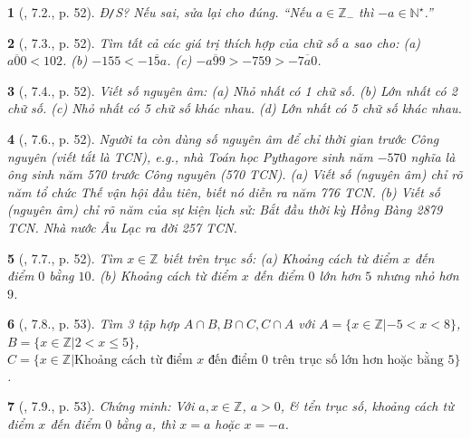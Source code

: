 \documentclass{article}
\newtheorem{baitoan}{}
\begin{document}
\begin{baitoan}[\cite{Binh_boi_duong_Toan_6_tap_1}, 7.2., p. 52]
	{\rm Đ{\tt/}S?} Nếu sai, sửa lại cho đúng. ``Nếu $a\in\mathbb{Z}_-$ thì $-a\in\mathbb{N}^\star$.''
\end{baitoan}

\begin{baitoan}[\cite{Binh_boi_duong_Toan_6_tap_1}, 7.3., p. 52]
	Tìm tất cả các giá trị thích hợp của chữ số $a$ sao cho: (a) $\overline{a00} < 102$. (b) $-155 < -\overline{15a}$. (c) $-\overline{a99} > -759 > -\overline{7a0}$.
\end{baitoan}

\begin{baitoan}[\cite{Binh_boi_duong_Toan_6_tap_1}, 7.4., p. 52]
	Viết số nguyên âm: (a) Nhỏ nhất có 1 chữ số. (b) Lớn nhất có 2 chữ số. (c) Nhỏ nhất có 5 chữ số khác nhau. (d) Lớn nhất có 5 chữ số khác nhau.
\end{baitoan}

\begin{baitoan}[\cite{Binh_boi_duong_Toan_6_tap_1}, 7.6., p. 52]
	Người ta còn dùng số nguyên âm để chỉ thời gian trước Công nguyên (viết tắt là {\rm TCN}), e.g., nhà Toán học Pythagore sinh năm $-570$ nghĩa là ông sinh năm 570 trước Công nguyên ({\rm570 TCN}). (a) Viết số (nguyên âm) chỉ rõ năm tổ chức Thế vận hội đầu tiên, biết nó diễn ra năm {\rm776 TCN}. (b) Viết số (nguyên âm) chỉ rõ năm của sự kiện lịch sử: Bắt đầu thời kỳ Hồng Bàng {\rm2879 TCN}. Nhà nước Âu Lạc ra đời {\rm257 TCN}.
\end{baitoan}

\begin{baitoan}[\cite{Binh_boi_duong_Toan_6_tap_1}, 7.7., p. 52]
	Tìm $x\in\mathbb{Z}$ biết trên trục số: (a) Khoảng cách từ điểm $x$ đến điểm $0$ bằng $10$. (b) Khoảng cách từ điểm $x$ đến điểm $0$ lớn hơn $5$ nhưng nhỏ hơn $9$.
\end{baitoan}

\begin{baitoan}[\cite{Binh_boi_duong_Toan_6_tap_1}, 7.8., p. 53]
	Tìm 3 tập hợp $A\cap B,B\cap C,C\cap A$ với $A = \{x\in\mathbb{Z}|-5 < x < 8\}$, $B = \{x\in\mathbb{Z}|2 < x\le5\}$, $C = \{x\in\mathbb{Z}|\mbox{Khoảng cách từ điểm $x$ đến điểm 0 trên trục số lớn hơn hoặc bằng 5}\}$. 
\end{baitoan}

\begin{baitoan}[\cite{Binh_boi_duong_Toan_6_tap_1}, 7.9., p. 53]
	Chứng minh: Với $a,x\in\mathbb{Z}$, $a > 0$, \& tển trục số, khoảng cách từ điểm $x$ đến điểm $0$ bằng $a$, thì $x = a$ hoặc $x = -a$.
\end{baitoan}
\end{document}
